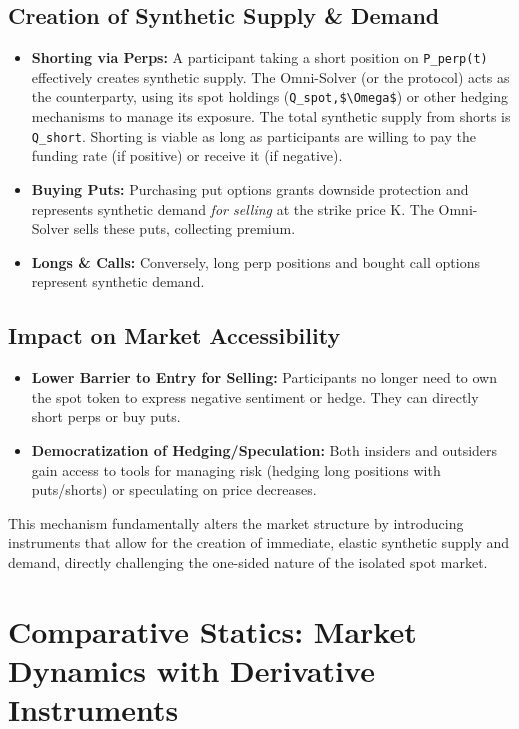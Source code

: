 \documentclass{article}
\begin{document}
\subsection{Creation of Synthetic Supply & Demand}
\begin{itemize}
    \item \textbf{Shorting via Perps:} A participant taking a short position on \lstinline{P_perp(t)} effectively creates synthetic supply. The Omni-Solver (or the protocol) acts as the counterparty, using its spot holdings (\lstinline{Q_spot,$\Omega$}) or other hedging mechanisms to manage its exposure. The total synthetic supply from shorts is \lstinline{Q_short}. Shorting is viable as long as participants are willing to pay the funding rate (if positive) or receive it (if negative).
    \item \textbf{Buying Puts:} Purchasing put options grants downside protection and represents synthetic demand \textit{for selling} at the strike price K. The Omni-Solver sells these puts, collecting premium.
    \item \textbf{Longs & Calls:} Conversely, long perp positions and bought call options represent synthetic demand.
\end{itemize}

\subsection{Impact on Market Accessibility}
\begin{itemize}
    \item \textbf{Lower Barrier to Entry for Selling:} Participants no longer need to own the spot token to express negative sentiment or hedge. They can directly short perps or buy puts.
    \item \textbf{Democratization of Hedging/Speculation:} Both insiders and outsiders gain access to tools for managing risk (hedging long positions with puts/shorts) or speculating on price decreases.
\end{itemize}
This mechanism fundamentally alters the market structure by introducing instruments that allow for the creation of immediate, elastic synthetic supply and demand, directly challenging the one-sided nature of the isolated spot market.

\section{Comparative Statics: Market Dynamics with Derivative Instruments}
\end{document}
